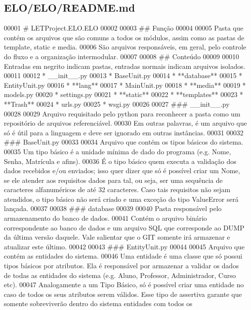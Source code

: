 \hypertarget{ELO_2ELO_2README_8md_source}{}\subsection{E\+L\+O/\+E\+L\+O/\+R\+E\+A\+D\+M\+E.md}

\begin{DoxyCode}
00001 # LETProject.ELO.ELO
00002 
00003 ## Função
00004 
00005 Pasta que contém os arquivos que são comuns a todos os módulos, assim como as pastas de template,
       static e media.
00006 São arquivos responsáveis, em geral, pelo controle do fluxo e a organização intermodular.
00007 
00008 ## Conteúdo
00009 
00010 Entradas em negrito indicam pastas, entradas normais indicam arquivos isolados.
00011 
00012 * \_\_init\_\_.py
00013 * BaseUnit.py
00014 * **database**
00015 * EntityUnit.py
00016 * **lang**
00017 * MainUnit.py
00018 * **media**
00019 * models.py
00020 * settings.py
00021 * **static**
00022 * **templates**
00023 * **Trash**
00024 * urls.py
00025 * wsgi.py
00026 
00027 ### \_\_init\_\_.py
00028 
00029 Arquivo requisitado pelo python para reconhecer a pasta como um repositório de arquivos referenciável.
00030 Em outras palavras, é um arquivo que só é útil para a linguagem e deve ser ignorado em outras
       instâncias.
00031 
00032 ### BaseUnit.py
00033 
00034 Arquivo que contém os tipos básicos do sistema.
00035 Um tipo básico é a unidade mínima de dado do programa (e.g. Nome, Senha, Matrícula e afins). 
00036 É o tipo básico quem executa a validação dos dados recebidos e/ou enviados; isso quer dizer que só é
       possível criar um Nome, se ele atender aos requisitos dados para tal, ou seja, ser uma sequência de
       caracteres alfanuméricos de até 32 caracteres. Caso tais requisitos não sejam atendidos, o tipo básico não será
       criado e uma exceção do tipo ValueError será lançada.
00037 
00038 ### database
00039 
00040 Pasta responsável pelo armazenamento do banco de dados.
00041 Contém o arquivo binário correspondente ao banco de dados e um arquivo SQL que corresponde ao DUMP da
       última versão daquele. Vale salientar que o GIT somente irá armazenar e atualizar este último.
00042 
00043 ### EntityUnit.py
00044 
00045 Arquivo que contém as entidades do sistema.
00046 Uma entidade é uma classe que só possui tipos básicos por atributos. Ela é responsável por armazenar a
       validar os dados de todas as entidades do sistema (e.g. Aluno, Professor, Administrador, Curso etc).
00047 Analogamente a um Tipo Básico, só é possível criar uma entidade no caso de todos os seus atributos
       serem válidos. Esse tipo de assertiva garante que somente sobreviverão dentro do sistema entidades com todos os

\end{DoxyCode}
